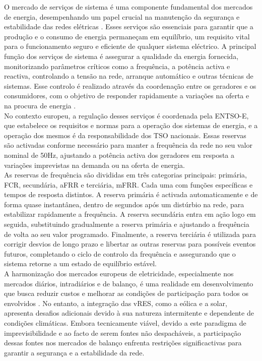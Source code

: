 O mercado de serviços de sistema é uma componente fundamental dos mercados de energia, desempenhando um papel crucial na manutenção da segurança e estabilidade das redes elétricas \cite{dgegmss}. Esses serviços são essenciais para garantir que a produção e o consumo de energia permaneçam em equilíbrio, um requisito vital para o funcionamento seguro e eficiente de qualquer sistema eléctrico. A principal função dos serviços de sistema é assegurar a qualidade da energia fornecida, monitorizando parâmetros críticos como a frequência, a potência activa e reactiva, controlando a tensão na rede, arranque automático e outras técnicas de sistemas. Esse controlo é realizado através da coordenação entre os geradores e os consumidores, com o objetivo de responder rapidamente a variações na oferta e na procura de energia \cite{Rassid2017} \cite{Carneiro2016}.\\
No contexto europeu, a regulação desses serviços é coordenada pela \gls{ENTSO-E}, que estabelece os requisitos e normas para a operação dos sistemas de energia, e a operação dos mesmos é da responsabilidade dos \gls{TSO} nacionais. Essas reservas são activadas conforme necessário para manter a frequência da rede no seu valor nominal de 50Hz, ajustando a potência activa dos geradores em resposta a variações imprevistas na demanda ou na oferta de energia.\\
As reservas de frequência são divididas em três categorias principais: primária, \gls{FCR}, secundária, \gls{aFRR} e terciária, \gls{mFRR}. Cada uma com funções específicas e tempos de resposta distintos. A reserva primária é activada automaticamente e de forma quase instantânea, dentro de segundos após um distúrbio na rede, para estabilizar rapidamente a frequência. A reserva secundária entra em ação logo em seguida, substituindo gradualmente a reserva primária e ajustando a frequência de volta ao seu valor programado. Finalmente, a reserva terciária é utilizada para corrigir desvios de longo prazo e libertar as outras reservas para possíveis eventos futuros, completando o ciclo de controlo da frequência e assegurando que o sistema retorne a um estado de equilíbrio estável.\\
A harmonização dos mercados europeus de eletricidade, especialmente nos mercados diários, intradiários e de balanço, é uma realidade em desenvolvimento que busca reduzir custos e melhorar as condições de participação para todos os envolvidos \cite{Algarvio2019}. No entanto, a integração das \gls{vRES}, como a eólica e a solar, apresenta desafios adicionais devido à sua natureza intermitente e dependente de condições climáticas. Embora tecnicamente viável, devido a este paradigma de imprevisibilidade e ao facto de serem fontes não despacháveis, a participação dessas fontes nos mercados de balanço enfrenta restrições significactivas para garantir a segurança e a estabilidade da rede.\\
